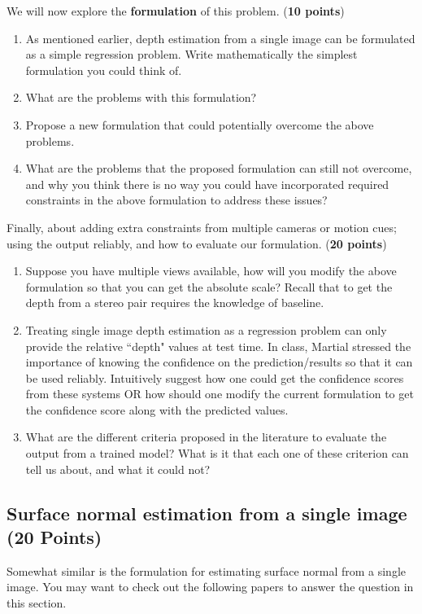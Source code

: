 \documentclass[11pt]{article}
\begin{document}
We will now explore the \textbf{formulation} of this problem. (\textbf{10 points})
\begin{enumerate}
\item As mentioned earlier, depth estimation from a single image can be formulated as a simple regression problem. Write mathematically the simplest formulation you could think of.
\item What are the problems with this formulation?
\item Propose a new formulation that could potentially overcome the above problems.
\item What are the problems that the proposed formulation can still not overcome, and why you think there is no way you could have incorporated required constraints in the above formulation to address these issues?
\end{enumerate}

Finally, about adding extra constraints from multiple cameras or motion cues; using the output reliably, and how to evaluate our formulation. (\textbf{20 points})
\begin{enumerate}
\item Suppose you have multiple views available, how will you modify the above formulation so that you can get the absolute scale? Recall that to get the depth from a stereo pair requires the knowledge of baseline.
\item Treating single image depth estimation as a regression problem can only provide the relative ``depth" values at test time. In class, Martial stressed the importance of knowing the confidence on the prediction/results so that it can be used reliably. Intuitively suggest how one could get the confidence scores from these systems OR how should one modify the current formulation to get the confidence score along with the predicted values.
\item What are the different criteria proposed in the literature to evaluate the output from a trained model? What is it that each one of these criterion can tell us about, and what it could not?
\end{enumerate}

\subsection{Surface normal estimation from a single image (20 Points)}
Somewhat similar is the formulation for estimating surface normal from a single image. You may want to check out the following papers to answer the question in this section. 
\end{document}
